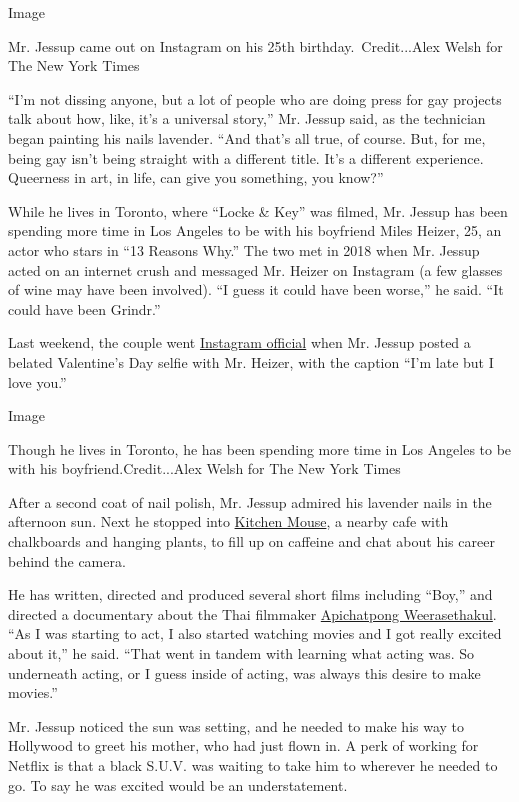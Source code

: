 Image

Mr. Jessup came out on Instagram on his 25th birthday.~Credit...Alex
Welsh for The New York Times

``I'm not dissing anyone, but a lot of people who are doing press for
gay projects talk about how, like, it's a universal story,'' Mr. Jessup
said, as the technician began painting his nails lavender. ``And that's
all true, of course. But, for me, being gay isn't being straight with a
different title. It's a different experience. Queerness in art, in life,
can give you something, you know?''

While he lives in Toronto, where ``Locke \& Key'' was filmed, Mr. Jessup
has been spending more time in Los Angeles to be with his boyfriend
Miles Heizer, 25, an actor who stars in ``13 Reasons Why.'' The two met
in 2018 when Mr. Jessup acted on an internet crush and messaged Mr.
Heizer on Instagram (a few glasses of wine may have been involved). ``I
guess it could have been worse,'' he said. ``It could have been
Grindr.''

Last weekend, the couple went
\href{https://www.instagram.com/p/B8m4GG7lMjV/}{Instagram official} when
Mr. Jessup posted a belated Valentine's Day selfie with Mr. Heizer, with
the caption ``I'm late but I love you.''

Image

Though he lives in Toronto, he has been spending more time in Los
Angeles to be with his boyfriend.Credit...Alex Welsh for The New York
Times

After a second coat of nail polish, Mr. Jessup admired his lavender
nails in the afternoon sun. Next he stopped into
\href{https://www.kitchenmousela.com/}{Kitchen Mouse}, a nearby cafe
with chalkboards and hanging plants, to fill up on caffeine and chat
about his career behind the camera.

He has written, directed and produced several short films including
``Boy,'' and directed a documentary about the Thai filmmaker
\href{https://www.criterion.com/current/posts/5489-mysterious-impressions-connor-jessup-on-apichatpong-weerasethakul}{Apichatpong
Weerasethakul}. ``As I was starting to act, I also started watching
movies and I got really excited about it,'' he said. ``That went in
tandem with learning what acting was. So underneath acting, or I guess
inside of acting, was always this desire to make movies.''

Mr. Jessup noticed the sun was setting, and he needed to make his way to
Hollywood to greet his mother, who had just flown in. A perk of working
for Netflix is that a black S.U.V. was waiting to take him to wherever
he needed to go. To say he was excited would be an understatement.

